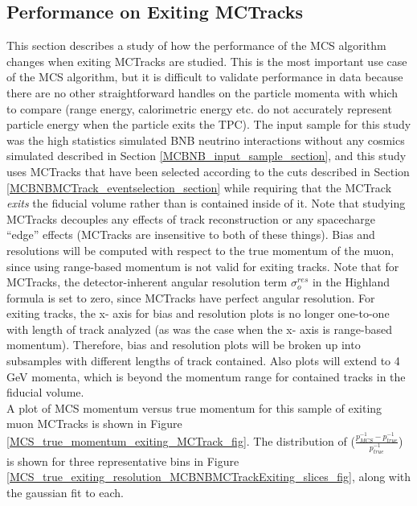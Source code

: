 \subsection{Performance on Exiting {\sc MCTracks}}\label{ExitingStudy_MCBNBMCTrack_section}
This section describes a study of how the performance of the MCS algorithm changes when exiting {\sc MCTracks} are studied. This is the most important use case of the MCS algorithm, but it is difficult to validate performance in data because there are no other straightforward handles on the particle momenta with which to compare (range energy, calorimetric energy etc. do not accurately represent particle energy when the particle exits the TPC). The input sample for this study was the high statistics simulated BNB neutrino interactions without any cosmics simulated described in Section \ref{MCBNB_input_sample_section}, and this study uses {\sc MCTracks} that have been selected according to the cuts described in Section \ref{MCBNBMCTrack_eventselection_section} while requiring that the {\sc MCTrack} \textit{exits} the fiducial volume rather than is contained inside of it. Note that studying {\sc MCTracks} decouples any effects of track reconstruction or any spacecharge ``edge'' effects ({\sc MCTracks} are insensitive to both of these things). Bias and resolutions will be computed with respect to the true momentum of the muon, since using range-based momentum is not valid for exiting tracks. Note that for {\sc MCTracks}, the detector-inherent angular resolution term $\sigma_o^{res}$ in the Highland formula is set to zero, since {\sc MCTracks} have perfect angular resolution. For exiting tracks, the x- axis for bias and resolution plots is no longer one-to-one with length of track analyzed (as was the case when the x- axis is range-based momentum). Therefore, bias and resolution plots will be broken up into subsamples with different lengths of track contained. Also plots will extend to 4 GeV momenta, which is beyond the momentum range for contained tracks in the fiducial volume.\\

A plot of MCS momentum versus true momentum for this sample of exiting muon {\sc MCTracks} is shown in Figure \ref{MCS_true_momentum_exiting_MCTrack_fig}. The distribution of ($\frac{p_{MCS}^{-1} - p_{true}^{-1}}{p_{true}^{-1}}$) is shown for three representative bins in Figure \ref{MCS_true_exiting_resolution_MCBNBMCTrackExiting_slices_fig}, along with the gaussian fit to each.\\

